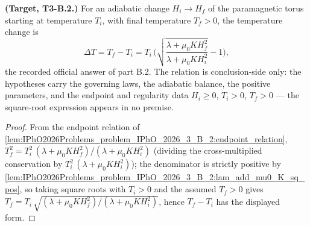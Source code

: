 \begin{theorem}
\label{thm:IPhO2026Problems_problem_IPhO_2026_3_B_2:adiabatic_temperature_change}
\textbf{(Target, T3-B.2.)}  For an adiabatic change $H_i \to H_f$ of the
paramagnetic torus starting at temperature $T_i$, with final temperature
$T_f > 0$, the temperature change is
\[
\Delta T = T_f - T_i
  = T_i\,\biggl(\sqrt{\frac{\lambda + \mu_0 K H_f^2}
                          {\lambda + \mu_0 K H_i^2}} - 1\biggr),
\]
the recorded official answer of part B.2.  The relation is conclusion-side
only: the hypotheses carry the governing laws, the adiabatic balance, the
positive parameters, and the endpoint and regularity data $H_i \ge 0$,
$T_i > 0$, $T_f > 0$ --- the square-root expression appears in no premise.
\end{theorem}
\begin{proof}
From the endpoint relation of
\cref{lem:IPhO2026Problems_problem_IPhO_2026_3_B_2:endpoint_relation},
$T_f^2 = T_i^2\,(\lambda + \mu_0 K H_f^2)/(\lambda + \mu_0 K H_i^2)$
(dividing the cross-multiplied conservation by
$T_i^2\,(\lambda + \mu_0 K H_i^2)$); the
denominator is strictly positive by
\cref{lem:IPhO2026Problems_problem_IPhO_2026_3_B_2:lam_add_mu0_K_sq_pos}, so
taking square roots with $T_i > 0$ and the assumed $T_f > 0$ gives
$T_f = T_i\,\sqrt{(\lambda + \mu_0 K H_f^2)/(\lambda + \mu_0 K H_i^2)}$,
hence $T_f - T_i$ has the displayed form.
\end{proof}
